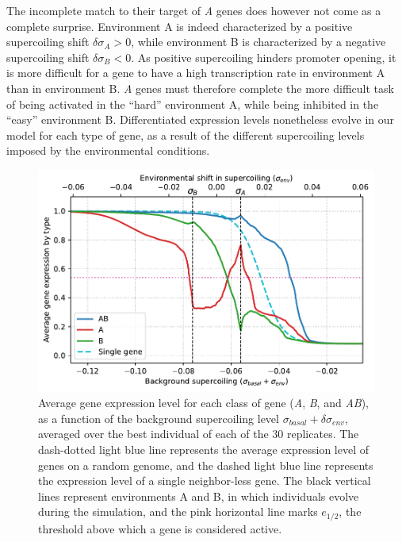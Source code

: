 The incomplete match to their target of \emph{A} genes does however not come as a complete surprise.
Environment A is indeed characterized by a positive supercoiling shift $\delta\sigma_A > 0$, while environment B is characterized by a negative supercoiling shift $\delta\sigma_B < 0$.
As positive supercoiling hinders promoter opening, it is more difficult for a gene to have a high transcription rate in environment A than in environment B.
\emph{A} genes must therefore complete the more difficult task of being activated in the ``hard'' environment A, while being inhibited in the ``easy'' environment B.
Differentiated expression levels nonetheless evolve in our model for each type of gene, as a result of the different supercoiling levels imposed by the environmental conditions.

\begin{figure}[H]
  \centering
  \includegraphics[width=\textwidth]{ploscb/img/activity_sigmas_avg.pdf}
  \caption[Average gene expression as a function of background supercoiling at the end of evolution in the advanced model]{Average gene expression level for each class of gene (\emph{A}, \emph{B}, and \emph{AB}), as a function of the background supercoiling level $\sigma_{basal} + \delta\sigma_{env}$, averaged over the best individual of each of the 30 replicates.
  The dash-dotted light blue line represents the average expression level of genes on a random genome, and the dashed light blue line represents the expression level of a single neighbor-less gene.
  The black vertical lines represent environments A and B, in which individuals evolve during the simulation, and the pink horizontal line marks $e_{1/2}$, the threshold above which a gene is considered active.}
  \label{fig:ploscb:activity_by_sigma}
\end{figure}

